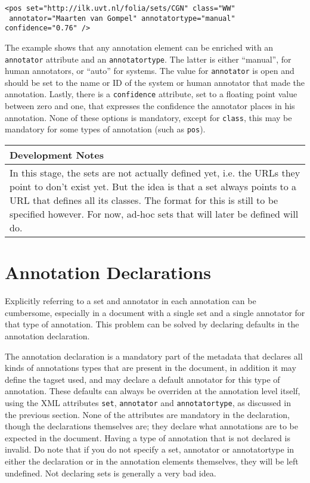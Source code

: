 \documentclass[a4paper,12pt]{article}
\newenvironment{devnotes}
{\newpage
\begin{center}
    \begin{tabular}[h!]{|p{0.8\textwidth}|}
    \hline
    {\bf Development Notes}\\\hline}
{   \\\hline
    \end{tabular}
\end{center}}
\begin{document}
\begin{verbatim}
<pos set="http://ilk.uvt.nl/folia/sets/CGN" class="WW" 
 annotator="Maarten van Gompel" annotatortype="manual" confidence="0.76" />
\end{verbatim}

The example shows that any annotation element can be enriched with an \texttt{annotator} attribute and an \texttt{annotatortype}. The latter is either ``manual'', for human annotators, or ``auto'' for systems.  The value for \texttt{annotator} is open and should be set to the name or ID of the system or human annotator that made the annotation. Lastly, there is a \texttt{confidence} attribute, set to a floating point value between zero and one, that expresses the confidence the annotator places in his annotation. None of these options is mandatory, except for \texttt{class}, this may be mandatory for some types of annotation (such as \texttt{pos}).

\begin{devnotes}
In this stage, the sets are not actually defined yet, i.e. the URLs they point to don't exist yet. But the idea is that a set always points to a URL that defines all its classes. The format for this is still to be specified however. For now, ad-hoc sets that will later be defined will do.
\end{devnotes}


\section{Annotation Declarations}

Explicitly referring to a set and annotator in each annotation can be cumbersome, especially in a document with a single set and a single annotator for that type of annotation. This problem can be solved by declaring defaults in the annotation declaration.

The annotation declaration is a mandatory part of the metadata that declares all kinds of annotations types that are present in the document, in addition it may define the tagset used, and may declare a default annotator for this type of annotation. These defaults can always be overriden at the annotation level itself, using the XML attributes \texttt{set}, \texttt{annotator} and \texttt{annotatortype}, as discussed in the previous section. None of the attributes are mandatory in the declaration, though the declarations themselves are; they declare what annotations are to be expected in the document. Having a type of annotation that is not declared is invalid. Do note that if you do not specify a set, annotator or annotatortype in either the declaration or in the annotation elements themselves, they will be left undefined. Not declaring sets is generally a very bad idea.  
\end{document}
